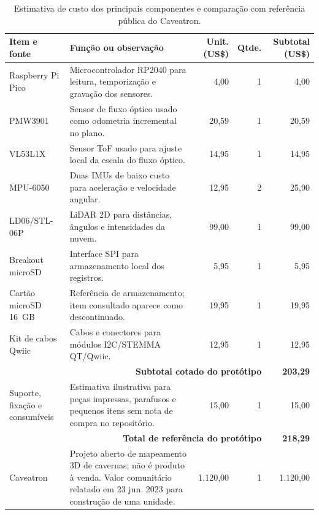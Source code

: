 \begin{table}[htbp]
    \centering
    \caption{Estimativa de custo dos principais componentes e comparação com referência pública do Caveatron.}
    \label{tab:custo_componentes}
    \scriptsize
    \begin{tabularx}{\textwidth}{@{}p{} X r r r@{}}
        \toprule
        \textbf{Item e fonte} & \textbf{Função ou observação} & \textbf{Unit. (US\$)} & \textbf{Qtde.} & \textbf{Subtotal (US\$)} \\
        \midrule
        Raspberry Pi Pico \parencite{raspberrypi2026pico} & Microcontrolador RP2040 para leitura, temporização e gravação dos sensores. & 4,00 & 1 & 4,00 \\
        PMW3901 \parencite{worldDroneMarket2026pmw3901} & Sensor de fluxo óptico usado como odometria incremental no plano. & 20,59 & 1 & 20,59 \\
        VL53L1X \parencite{adafruit2026vl53l1x} & Sensor ToF usado para ajuste local da escala do fluxo óptico. & 14,95 & 1 & 14,95 \\
        MPU-6050 \parencite{adafruit2026mpu6050} & Duas IMUs de baixo custo para aceleração e velocidade angular. & 12,95 & 2 & 25,90 \\
        LD06/STL-06P \parencite{sensorlidar2026stl06p} & LiDAR 2D para distâncias, ângulos e intensidades da nuvem. & 99,00 & 1 & 99,00 \\
        Breakout microSD \parencite{sparkfun2026microsdBreakout} & Interface SPI para armazenamento local dos registros. & 5,95 & 1 & 5,95 \\
        Cartão microSD 16~GB \parencite{sparkfun2026microsdCard} & Referência de armazenamento; item consultado aparece como descontinuado. & 19,95 & 1 & 19,95 \\
        Kit de cabos Qwiic \parencite{sparkfun2026qwiicCableKit} & Cabos e conectores para módulos I2C/STEMMA QT/Qwiic. & 12,95 & 1 & 12,95 \\
        \midrule
        \multicolumn{4}{r}{\textbf{Subtotal cotado do protótipo}} & \textbf{203,29} \\
        Suporte, fixação e consumíveis & Estimativa ilustrativa para peças impressas, parafusos e pequenos itens sem nota de compra no repositório. & 15,00 & 1 & 15,00 \\
        \multicolumn{4}{r}{\textbf{Total de referência do protótipo}} & \textbf{218,29} \\
        \midrule
        Caveatron \parencite{caveatron2026official,caveatronDiscuss2023cost} & Projeto aberto de mapeamento 3D de cavernas; não é produto à venda. Valor comunitário relatado em 23 jun. 2023 para construção de uma unidade. & 1.120,00 & 1 & 1.120,00 \\
        \bottomrule
    \end{tabularx}
\end{table}

